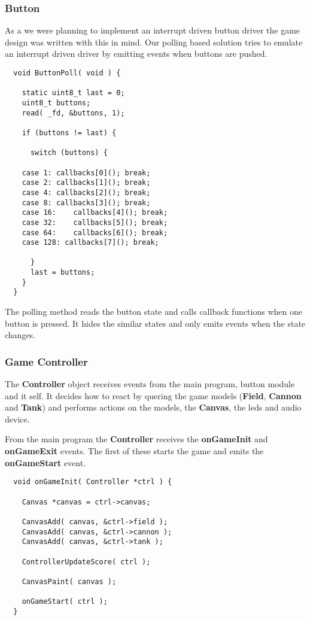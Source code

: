 \subsubsection{Button}
As a we were planning to implement an interrupt driven button driver the game design
was written with this in mind. Our polling based solution tries to emulate an interrupt
driven driver by emitting events when buttons are pushed.

\begin{lstlisting}
  void ButtonPoll( void ) {

    static uint8_t last = 0;
    uint8_t buttons;
    read( _fd, &buttons, 1);

    if (buttons != last) {

      switch (buttons) {

	case 1:	callbacks[0](); break;
	case 2:	callbacks[1](); break;
	case 4:	callbacks[2](); break;
	case 8:	callbacks[3](); break;
	case 16:	callbacks[4](); break;
	case 32:	callbacks[5](); break;
	case 64:	callbacks[6](); break;
	case 128: callbacks[7](); break;

      }
      last = buttons;
    }
  }
\end{lstlisting}
The polling method reads the button state and calls callback functions when one button
is pressed. It hides the similar states and only emits events when the state changes.

\subsubsection{Game Controller}
The {\bf Controller} object receives events from the main program, button module and it self.
It decides how to react by quering the game models ({\bf Field}, {\bf Cannon} and {\bf Tank})
and performs actions on the models, the {\bf Canvas}, the leds and audio device.

From the main program the {\bf Controller} receives the {\bf onGameInit} and {\bf onGameExit} events.
The first of these starts the game and emits the {\bf onGameStart} event.
\begin{lstlisting}
  void onGameInit( Controller *ctrl ) {

    Canvas *canvas = ctrl->canvas;

    CanvasAdd( canvas, &ctrl->field );
    CanvasAdd( canvas, &ctrl->cannon );
    CanvasAdd( canvas, &ctrl->tank );

    ControllerUpdateScore( ctrl );

    CanvasPaint( canvas );

    onGameStart( ctrl );
  }
\end{lstlisting}

